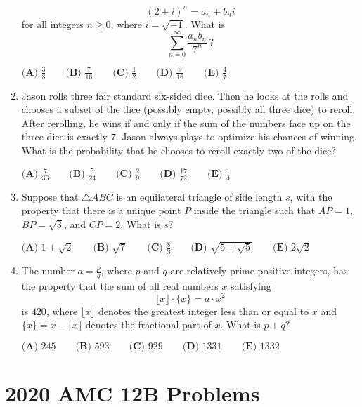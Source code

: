 \documentclass{article}
\begin{document}
\begin{enumerate}[label=\arabic*., itemsep=0.5em]
\begin{equation*}
(2 + i)^n = a_n + b_ni
\end{equation*}
for all integers \(n\geq 0\), where \(i = \sqrt{-1}\). What is
\begin{equation*}
\sum_{n=0}^\infty\frac{a_nb_n}{7^n}\,?
\end{equation*}

\(\textbf{(A) }\frac 38\qquad\textbf{(B) }\frac7{16}\qquad\textbf{(C) }\frac12\qquad\textbf{(D) }\frac9{16}\qquad\textbf{(E) }\frac47\)\par \vspace{0.5em}\item Jason rolls three fair standard six-sided dice. Then he looks at the rolls and chooses a subset of the dice (possibly empty, possibly all three dice) to reroll. After rerolling, he wins if and only if the sum of the numbers face up on the three dice is exactly \(7\). Jason always plays to optimize his chances of winning. What is the probability that he chooses to reroll exactly two of the dice?

\(\textbf{(A) } \frac{7}{36} \qquad\textbf{(B) } \frac{5}{24} \qquad\textbf{(C) } \frac{2}{9} \qquad\textbf{(D) } \frac{17}{72} \qquad\textbf{(E) } \frac{1}{4}\)\par \vspace{0.5em}\item Suppose that \(\triangle ABC\) is an equilateral triangle of side length \(s\), with the property that there is a unique point \(P\) inside the triangle such that \(AP = 1\), \(BP = \sqrt{3}\), and \(CP = 2\). What is \(s?\)

\(\textbf{(A) } 1 + \sqrt{2} \qquad \textbf{(B) } \sqrt{7} \qquad \textbf{(C) } \frac{8}{3} \qquad \textbf{(D) } \sqrt{5 + \sqrt{5}} \qquad \textbf{(E) } 2\sqrt{2}\)\par \vspace{0.5em}\item The number \(a = \tfrac{p}{q}\), where \(p\) and \(q\) are relatively prime positive integers, has the property that the sum of all real numbers \(x\) satisfying
\begin{equation*}
\lfloor x \rfloor \cdot \{x\} = a \cdot x^2
\end{equation*}
is \(420\), where \(\lfloor x \rfloor\) denotes the greatest integer less than or equal to \(x\) and \(\{x\} = x - \lfloor x \rfloor\) denotes the fractional part of \(x\). What is \(p + q?\)

\(\textbf{(A) } 245 \qquad \textbf{(B) } 593 \qquad \textbf{(C) } 929 \qquad \textbf{(D) } 1331 \qquad \textbf{(E) } 1332\)\par \vspace{0.5em}\end{enumerate}\newpage\section*{2020 AMC 12B Problems}
\end{document}
